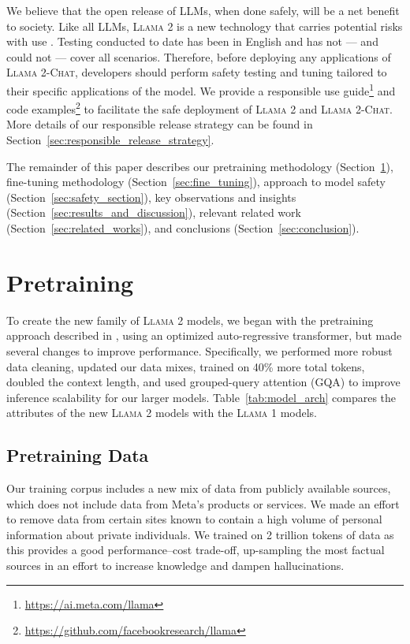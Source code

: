 We believe that the open release of LLMs, when done safely, will be a net benefit to society. Like all LLMs, \textsc{Llama 2} is a new technology that carries potential risks with use \citep{bender2021dangers,weidinger2021ethical,solaiman2023evaluating}. Testing conducted to date has  been in English and has not — and could not — cover all scenarios.  Therefore, before deploying any applications of \textsc{Llama 2-Chat}, developers should perform safety testing and tuning tailored to their specific applications of the model. We provide a responsible use guide\footnote{\url{https://ai.meta.com/llama}} and code examples\footnote{\url{https://github.com/facebookresearch/llama}} to facilitate the safe deployment of \textsc{Llama 2} and \textsc{Llama 2-Chat}. More details of our responsible release strategy can be found in Section~\ref{sec:responsible_release_strategy}.

The remainder of this paper describes our pretraining methodology (Section~\ref{sec:pretraining}), fine-tuning methodology (Section~\ref{sec:fine_tuning}),  approach to model safety (Section~\ref{sec:safety_section}), key observations and insights (Section~\ref{sec:results_and_discussion}), relevant related work (Section~\ref{sec:related_works}), and  conclusions (Section~\ref{sec:conclusion}).    

\section{Pretraining}
\label{sec:pretraining}
To create the new family of \textsc{Llama 2} models, we began with the pretraining approach described in \cite{Touvron2023LLaMAOA}, using an optimized auto-regressive transformer, but made several changes to improve performance. Specifically, we performed more robust data cleaning, updated our data mixes, trained on 40\% more total tokens, doubled the context length, and used grouped-query attention (GQA) to improve inference scalability for our larger models. Table~\ref{tab:model_arch} compares the attributes of the new \textsc{Llama 2} models with the \textsc{Llama 1} models.

\subsection{Pretraining Data} \label{sec:pretraining_data}
Our training corpus includes a new mix of data from publicly available sources, which does not include data from Meta's products or services. We made an effort to remove data from certain sites known to contain a high volume of personal information about private individuals. We trained on 2 trillion tokens of data as this provides a good performance--cost trade-off, up-sampling the most factual sources in an effort to increase knowledge and dampen hallucinations.

